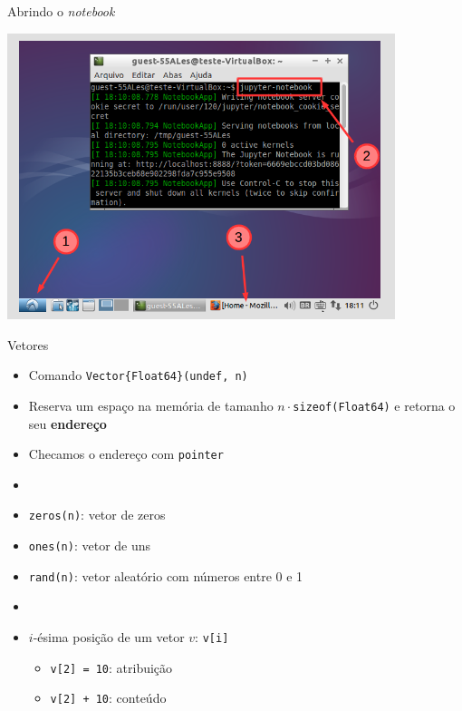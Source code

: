 \documentclass[]{beamer}
\newcommand{\code}[1]{\colorbox[gray]{0.8}{\texttt{#1}}}
\begin{document}
\begin{frame}{Abrindo o \textit{notebook}}

  \begin{center}
    \includegraphics[width=0.85\textwidth]{figures/notebook.png}
  \end{center}

\end{frame}

\begin{frame}[fragile]{Vetores}

  \begin{itemize}
  \item Comando \code{Vector\{Float64\}(\alert{undef}, n)}

  \item Reserva um espaço na memória de tamanho
    $n \cdot$\verb+sizeof(Float64)+ e retorna o seu \textbf{endereço}

  \item Checamos o endereço com \code{pointer}

  \item[]

  \item \code{zeros(n)}: vetor de zeros
  \item \code{ones(n)}: vetor de uns
  \item \code{rand(n)}: vetor aleatório com números entre 0 e 1

  \item[]

  \item $i$-ésima posição de um vetor $v$: \code{v[i]}
    
    \begin{itemize}
    \item \code{v[2] = 10}: atribuição
    \item \code{v[2] + 10}: conteúdo
    \end{itemize}

  \end{itemize}
  
\end{frame}
\end{document}
